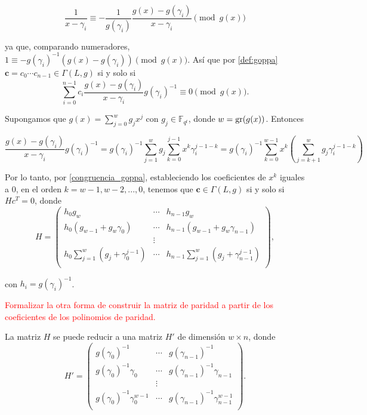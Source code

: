 \[
    \frac{1}{x - \gamma_i} \equiv - \frac{1}{g(\gamma_i)} \frac{g(x) - g(\gamma_i)}{x - \gamma_i} \pmod{ g(x)}
\]

ya que, comparando numeradores, $1 \equiv - g(\gamma_i)^{-1} \left( g(x) - g(\gamma_i) \right) \pmod{g(x)}$. Así que por \eqref{def:goppa} $\textbf{c} = c_0 \cdots c_{n-1} \in \Gamma(L,g)$ si y solo si
\begin{equation}
    \label{congruencia_goppa}
    \sum_{i=0}^{n-1} c_i \frac{g(x) - g(\gamma_i)}{x - \gamma_i} g(\gamma_i)^{-1} \equiv 0 \pmod{g(x)}.
\end{equation}

Supongamos que $g(x) = \sum_{j=0}^w g_j x^j$ con $g_j \in \mathbb{F}_{q^t}$, donde $w = \operatorname{gr}(g(x))$. Entonces

\[
    \frac{g(x) - g(\gamma_i)}{x - \gamma_i} g(\gamma_i)^{-1} = g(\gamma_i)^{-1} \sum_{j=1}^w g_j \sum_{k=0}^{j-1} x^k \gamma_i^{j-1-k} = g(\gamma_i)^{-1} \sum_{k=0}^{w-1} x^k \left( \sum_{j=k+1}^w g_j \gamma_i^{j-1-k} \right)
\]

Por lo tanto, por \eqref{congruencia_goppa}, estableciendo los coeficientes de $x^k$ iguales a $0$, en el orden $k = w - 1, w - 2, ..., 0$, tenemos que $\textbf{c} \in \Gamma(L,g)$ si y solo si $Hc^T = 0$, donde 
\begin{equation}
    H = \left(
        \begin{array}{ccc} 
            h_0 g_w & \cdots & h_{n-1} g_w  \\
            h_0 (g_{w-1} + g_w \gamma_0) & \cdots & h_{n-1} (g_{w-1} + g_w \gamma_{n-1}) \\
            & \vdots & \\
            h_0 \sum_{j=1}^w \left( g_j + \gamma_0^{j-1} \right) & \cdots & h_{n-1} \sum_{j=1}^w \left( g_{j} + \gamma_{n-1}^{j-1} \right) \\
        \end{array}
        \right),
\end{equation}

con $h_i = g(\gamma_i)^{-1}$.

\textcolor{red}{Formalizar la otra forma de construir la matriz de paridad a partir de los coeficientes de los polinomios de paridad.}

\begin{proposition}
    La matriz $H$ se puede reducir a una matriz $H'$ de dimensión $w \times n$, donde 
    \begin{equation}
        H' = \left(
            \begin{array}{ccc} 
                g(\gamma_0)^{-1} & \cdots & g(\gamma_{n-1})^{-1}  \\
                g(\gamma_0)^{-1} \gamma_0 & \cdots & g(\gamma_{n-1})^{-1} \gamma_{n-1} \\
                & \vdots & \\
                g(\gamma_0)^{-1} \gamma_0^{w-1} & \cdots & g(\gamma_{n-1})^{-1} \gamma_{n-1}^{w-1} \\
            \end{array}
            \right).
    \end{equation}
\end{proposition}

